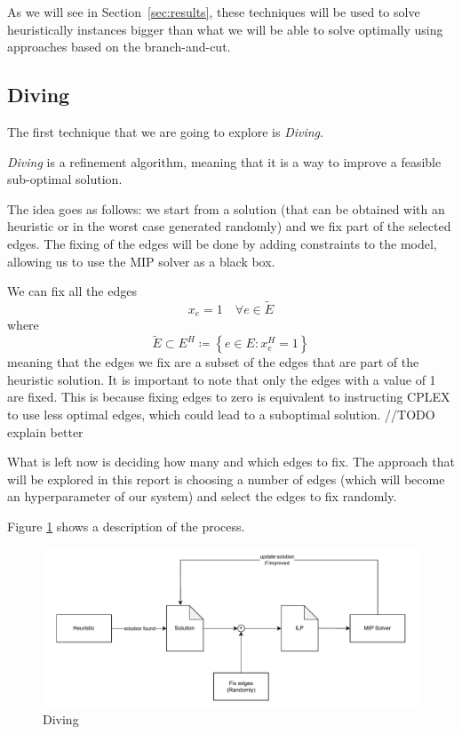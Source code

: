 \documentclass{article}
\begin{document}
As we will see in Section~\ref{sec:results}, these techniques will be used to solve
heuristically instances bigger than what we will be able to solve optimally using approaches
based on the branch-and-cut.

\subsection{Diving}
The first technique that we are going to explore is \textit{Diving}.

\textit{Diving} is a refinement algorithm, meaning that it is a way to improve a feasible
sub-optimal solution.

The idea goes as follows: we start from a solution (that can be obtained with an heuristic or in
the worst case generated randomly) and we fix part of the selected edges. The fixing of the
edges will be done by adding constraints to the model, allowing us to use the MIP solver
as a black box.

We can fix all the edges
\begin{equation*}
  x_{e}=1 \quad \forall e \in \tilde{E}
\end{equation*}
where
\begin{equation*}
  \tilde{E} \subset E^{H} \coloneq \left\{ e \in E : x_{e}^{H} = 1 \right\}
\end{equation*}
meaning that the edges we fix are a subset of the edges that are part of the heuristic solution.
It is important to note that only the edges with a value of 1 are fixed. This is because fixing
edges to zero is equivalent to instructing CPLEX to use less optimal edges, which could lead to a suboptimal solution.
//TODO explain better

What is left now is deciding how many and which edges to fix. The approach that will be explored
in this report is choosing a number of edges (which will become an hyperparameter of our system)
and select the edges to fix randomly.

Figure \ref{fig:diving} shows a description of the process.

\begin{figure}[H]
        \caption{Diving}
        \label{fig:diving}
        \centering
        \includegraphics[width=340pt]{assets/diving.drawio.pdf}
\end{figure}
\end{document}
